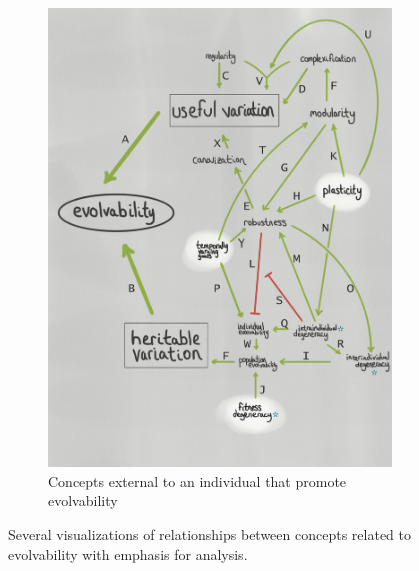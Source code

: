 \begin{figure}
\begin{subfigure}[b]{0.45\textwidth}
        \includegraphics[width=\textwidth]{img/mindmap_external}
        \caption{Concepts external to an individual that promote evolvability}
        \label{subfig:mindmap_external}
    \end{subfigure}
  \captionsetup{singlelinecheck=off,justification=raggedright}
  \caption{Several visualizations of relationships between concepts related to evolvability with emphasis for analysis.}
  \label{fig:mindmap_analysis}
\end{figure}